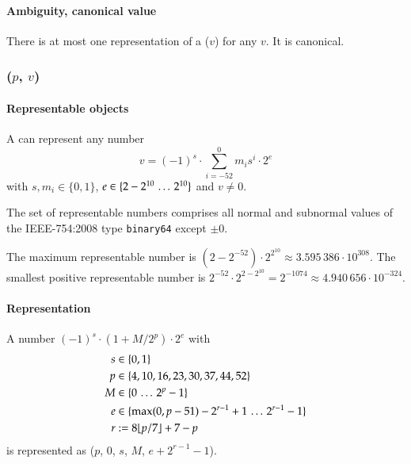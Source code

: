 \paragraph{Ambiguity, canonical value}

There is at most one representation of a \DborIntegerValue($v$) for any $v$.
It is canonical.


\subsubsection{\DborBinaryRationalValue(\texorpdfstring{$p$, $v$}{p, v})}
\hypertarget{sec:def:BinaryRationalValue}{}

\paragraph{Representable objects}

A \DborBinaryRationalValue can represent any number
\begin{equation}
    v = (-1)^s \cdot \sum_{i = -52}^0 m_i s^i \cdot 2^e
\end{equation}
with $s, m_i \in \{0, 1\}$, $e \in \{2 - 2^{10} \,\ldots\, 2^{10}\}$ and $v \ne 0$.

The set of representable numbers comprises all normal and subnormal values of the IEEE-754:2008 type
\texttt{binary64} except $\pm 0$.

\smallskip
The maximum representable number is $(2 - 2^{-52}) \cdot 2^{2^{10}} \approx 3.595\,386 \cdot 10^{308}$.
The smallest positive representable number is $2^{-52} \cdot 2^{2-2^{10}} = 2^{-1074}
\approx 4.940\,656 \cdot 10^{-324}$.

\paragraph{Representation}

A number $(-1)^s \cdot (1 + M/2^p) \cdot 2^e$ with
\begin{align*}
    s & \in \{0, 1\} \\
    p & \in \{4, 10, 16, 23, 30, 37, 44, 52\} \\
    M & \in \{0 \,\ldots\, 2^p - 1\} \\
    e & \in \{\max(0, p - 51) - 2^{r - 1} + 1 \,\ldots\, 2^{r - 1} - 1\} \\
    r & := 8 \lfloor p / 7 \rfloor + 7 - p
\end{align*}%
is represented as
\DborBinaryRationalToken*($p$, $0$, $s$, $M$, $e + 2^{r - 1} - 1$).

